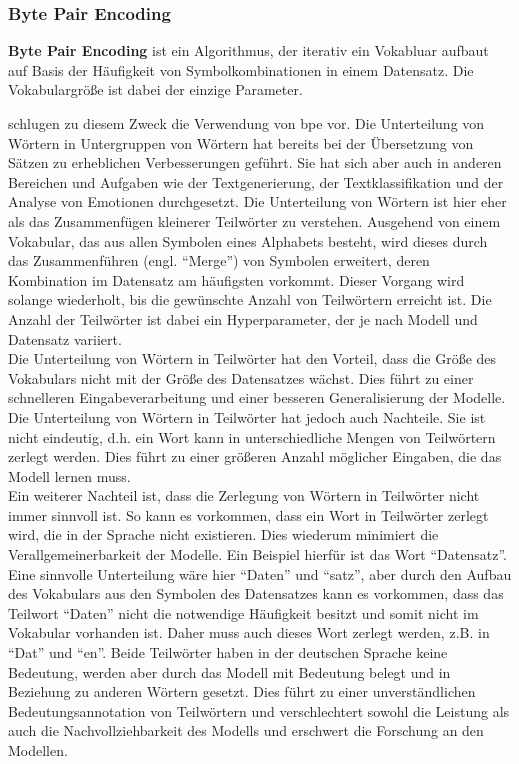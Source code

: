 \subsubsection{Byte Pair Encoding}
\begin{definition}\label{def:bpe}
    \textbf{Byte Pair Encoding} ist ein Algorithmus, der iterativ ein Vokabluar aufbaut auf Basis der Häufigkeit von Symbolkombinationen in einem Datensatz.
    Die Vokabulargröße ist dabei der einzige Parameter.
\end{definition}
\citet{bpe} schlugen zu diesem Zweck die Verwendung von \ac{bpe} vor.
Die Unterteilung von Wörtern in Untergruppen von Wörtern hat bereits bei der Übersetzung von Sätzen zu erheblichen Verbesserungen geführt.
Sie hat sich aber auch in anderen Bereichen und Aufgaben wie der Textgenerierung, der Textklassifikation und der Analyse von Emotionen durchgesetzt.
Die Unterteilung von Wörtern ist hier eher als das Zusammenfügen kleinerer Teilwörter zu verstehen.
Ausgehend von einem Vokabular, das aus allen Symbolen eines Alphabets besteht, wird dieses durch das Zusammenführen (engl. \enquote{Merge}) von Symbolen erweitert, deren Kombination im Datensatz am häufigsten vorkommt.
Dieser Vorgang wird solange wiederholt, bis die gewünschte Anzahl von Teilwörtern erreicht ist.
Die Anzahl der Teilwörter ist dabei ein Hyperparameter, der je nach Modell und Datensatz variiert.\\

Die Unterteilung von Wörtern in Teilwörter hat den Vorteil, dass die Größe des Vokabulars nicht mit der Größe des Datensatzes wächst.
Dies führt zu einer schnelleren Eingabeverarbeitung und einer besseren Generalisierung der Modelle.
Die Unterteilung von Wörtern in Teilwörter hat jedoch auch Nachteile.
Sie ist nicht eindeutig, d.h. ein Wort kann in unterschiedliche Mengen von Teilwörtern zerlegt werden.
Dies führt zu einer größeren Anzahl möglicher Eingaben, die das Modell lernen muss.\\

Ein weiterer Nachteil ist, dass die Zerlegung von Wörtern in Teilwörter nicht immer sinnvoll ist.
So kann es vorkommen, dass ein Wort in Teilwörter zerlegt wird, die in der Sprache nicht existieren.
Dies wiederum minimiert die Verallgemeinerbarkeit der Modelle.
Ein Beispiel hierfür ist das Wort \enquote{Datensatz}.
Eine sinnvolle Unterteilung wäre hier \enquote{Daten} und \enquote{satz}, aber durch den Aufbau des Vokabulars aus den Symbolen des Datensatzes kann es vorkommen, dass das Teilwort \enquote{Daten} nicht die notwendige Häufigkeit besitzt und somit nicht im Vokabular vorhanden ist.
Daher muss auch dieses Wort zerlegt werden, z.B. in \enquote{Dat} und \enquote{en}.
Beide Teilwörter haben in der deutschen Sprache keine Bedeutung, werden aber durch das Modell mit Bedeutung belegt und in Beziehung zu anderen Wörtern gesetzt.
Dies führt zu einer unverständlichen Bedeutungsannotation von Teilwörtern und verschlechtert sowohl die Leistung als auch die Nachvollziehbarkeit des Modells und erschwert die Forschung an den Modellen.

